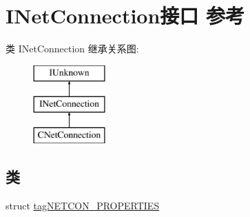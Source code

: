 \hypertarget{interface_i_net_connection}{}\section{I\+Net\+Connection接口 参考}
\label{interface_i_net_connection}
类 I\+Net\+Connection 继承关系图\+:\begin{figure}[H]
\begin{center}
\leavevmode
\includegraphics[height=3.000000cm]{interface_i_net_connection}
\end{center}
\end{figure}
\subsection*{类}
\begin{DoxyCompactItemize}
\item 
struct \hyperlink{struct_i_net_connection_1_1tag_n_e_t_c_o_n___p_r_o_p_e_r_t_i_e_s}{tag\+N\+E\+T\+C\+O\+N\+\_\+\+P\+R\+O\+P\+E\+R\+T\+I\+ES}
\end{DoxyCompactItemize}
